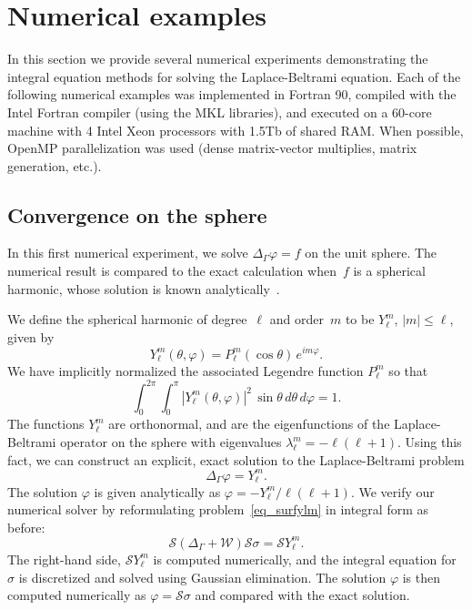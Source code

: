 \documentclass[11pt]{article}
\renewcommand{\phi}{\varphi}
\newcommand{\surflap}{\Delta_\Gamma}
\newcommand{\cS}{\mathcal S}
\newcommand{\cW}{\mathcal W}
\numberwithin{equation}{section}
\begin{document}
\section{Numerical examples}
\label{sec_numerical}

In this section we provide several numerical experiments demonstrating
the integral equation methods for solving
the Laplace-Beltrami equation. Each of the following numerical
examples was implemented in Fortran 90, compiled with the Intel
Fortran compiler (using the MKL libraries), and executed
on a 60-core machine with 4 Intel Xeon processors
with 1.5Tb of shared RAM. When possible, OpenMP parallelization was
used (dense matrix-vector multiplies, matrix generation, etc.).


\subsection{Convergence on the sphere}
\label{sec_sphere}

In this first numerical experiment,
we solve $\surflap \phi = f$ on the unit sphere.
The numerical  result is compared to the exact calculation when~$f$ is
a spherical harmonic, whose solution is known
analytically~\cite{vico_2014}.

We define the spherical harmonic of degree~$\ell$ and order~$m$ to be
$Y^m_\ell$, $|m| \leq \ell$, given by
\begin{equation}
Y^m_\ell(\theta,\phi) = P^m_\ell(\cos\theta) \, e^{im\phi}.
\end{equation}
We have implicitly normalized the associated Legendre function
$P^m_\ell$ so that
\begin{equation}
\int_0^{2\pi} \int_0^\pi \left| Y^m_\ell(\theta,\phi) \right|^2 \, \sin\theta \,
d\theta \, d\phi = 1.
\end{equation}
The functions $Y^m_\ell$ are orthonormal, and are
the eigenfunctions of the Laplace-Beltrami
operator on the sphere with eigenvalues $\lambda^m_\ell =
-\ell(\ell+1)$.
Using this fact, we can construct an explicit, exact solution to the
Laplace-Beltrami problem
\begin{equation}\label{eq_surfylm}
\surflap \phi = Y^m_\ell.
\end{equation}
The solution $\phi$ is given analytically as
$\phi = -Y^m_\ell/\ell(\ell+1)$.
We verify our numerical solver by reformulating
problem~\eqref{eq_surfylm} in integral form as before:
\begin{equation}
\cS \left( \surflap + \cW \right) \cS \sigma = \cS Y^m_\ell.
\end{equation}
The right-hand side, $\cS Y^m_\ell$ is computed numerically, and the
integral equation for $\sigma$
is discretized and solved using Gaussian elimination.
The solution $\phi$ is then computed numerically as $\phi = \cS
\sigma$ and compared with the exact solution.
\end{document}
